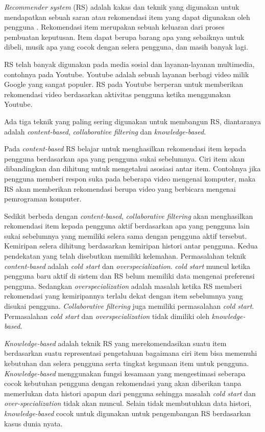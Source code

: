 \textit{Recommender system} (RS) adalah kakas dan teknik yang digunakan untuk mendapatkan sebuah saran atau rekomendasi item yang dapat digunakan oleh pengguna \cite{ricci2011book}. Rekomendasi item merupakan sebuah keluaran dari proses pembuatan keputusan. Item dapat berupa barang apa yang sebaiknya untuk dibeli, musik apa yang cocok dengan selera pengguna, dan masih banyak lagi.
\par
RS telah banyak digunakan pada media sosial dan layanan-layanan multimedia, contohnya pada Youtube. Youtube adalah sebuah layanan berbagi video milik Google yang sangat populer. RS pada Youtube berperan untuk memberikan rekomendasi video berdasarkan aktivitas pengguna ketika menggunakan Youtube.
\par
Ada tiga teknik yang paling sering digunakan untuk membangun RS, diantaranya adalah \textit{content-based}, \textit{collaborative filtering} dan \textit{knowledge-based}. 
\par
Pada \textit{content-based} RS belajar untuk menghasilkan rekomendasi item kepada pengguna berdasarkan apa yang pengguna sukai sebelumnya\cite{moreno2013sigtur}. Ciri item akan dibandingkan dan dihitung untuk mengetahui asosiasi antar item. Contohnya jika pengguna memberi respon suka pada beberapa video mengenai komputer, maka RS akan memberikan rekomendasi berupa video yang berbicara mengenai pemrograman komputer.
\par
Sedikit berbeda dengan \textit{content-based}, \textit{collaborative filtering} akan menghasilkan rekomendasi item kepada pengguna aktif berdasarkan apa yang pengguna lain sukai sebelumnya yang memiliki selera sama dengan pengguna aktif tersebut\cite{castillo2008samap}. Kemiripan selera dihitung berdasarkan kemiripan histori antar pengguna.
Kedua pendekatan yang telah disebutkan memiliki kelemahan. Permasalahan teknik \textit{content-based} adalah \textit{cold start} dan \textit{overspecialization}. \textit{cold start} muncul ketika pengguna baru aktif di sistem dan RS belum memiliki data mengenai preferensi pengguna. Sedangkan \textit{overspecialization} adalah masalah ketika RS memberi rekomendasi yang kemiripannya terlalu dekat dengan item sebelumnya yang disukai pengguna\cite{blanco2008flexible}. \textit{Collaborative filtering} juga memiliki permasalahan \textit{cold start}\cite{ricci2011book}. Permasalahan \textit{cold start} dan \textit{overspecialization} tidak dimiliki oleh \textit{knowledge-based}.
\par
\textit{Knowledge-based} adalah teknik RS yang merekomendasikan suatu item berdasarkan suatu representasi pengetahuan bagaimana ciri item bisa memenuhi kebutuhan dan selera pengguna serta tingkat kegunaan item untuk pengguna. \textit{Knowledge-based}  menggunakan fungsi kesamaan yang mengestimasi seberapa cocok kebutuhan pengguna dengan rekomendasi yang akan diberikan tanpa memerlukan data histori apapun dari pengguna sehingga masalah \textit{cold start} dan \textit{over-specialization} tidak akan muncul. Selain tidak membutuhkan data histori, \textit{knowledge-based} cocok untuk digunakan untuk pengembangan RS berdasarkan kasus dunia nyata.

